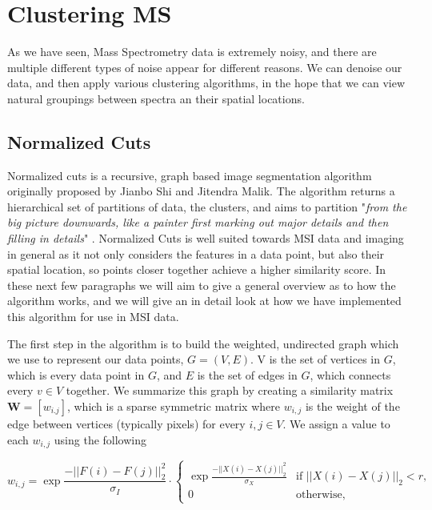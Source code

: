 \documentclass[11pt,openany]{book}
\begin{document}
\chapter{Clustering MS}
As we have seen, Mass Spectrometry data is extremely noisy, and there are multiple different types of noise appear for different reasons. We can denoise our data, and then apply various clustering algorithms, in the hope that we can view natural groupings between spectra an their spatial locations. 

\section{Normalized Cuts}
Normalized cuts is a recursive, graph based image segmentation algorithm originally proposed by Jianbo Shi and Jitendra Malik. The algorithm returns a hierarchical set of partitions of data, the clusters, and aims to partition "\textit{from the big picture downwards, like a painter first marking out major details and then filling in details}" \cite{normalized_cuts_algorithm}. Normalized Cuts is well suited towards MSI data and imaging in general as it not only considers the features in a data point, but also their spatial location, so points closer together achieve a higher similarity score. In these next few paragraphs we will aim to give a general overview as to how the algorithm works, and we will give an in detail look at how we have implemented this algorithm for use in MSI data.

The first step in the algorithm is to build the weighted, undirected graph which we use to represent our data points, $G = (V, E)$. V is the set of vertices in $G$, which is every data point in $G$, and $E$ is the set of edges in $G$, which connects every $v \in V$ together. We summarize this graph by creating a similarity matrix $\mathbf{W} = [w_{i.j}]$, which is a sparse symmetric matrix where $w_{i,j}$ is the weight of the edge between vertices (typically pixels) for every $i,j \in V$. We assign a value to each $w_{i,j}$ using the following 

\begin{equation}
    w_{i,j} = \exp{ \frac{ -{|| F(i) - F(j) ||}_2^2 }{ \sigma_I }   }  \cdot 
        \begin{cases}
        \exp{ \frac{ -{|| X(i) - X(j) ||}_2^2 }{ \sigma_X }   } & \text{if } || X(i) - X(j) ||_2 < r,\\ 
        0 & \text{otherwise},
        \end{cases}
    \label{equation:norm_cuts_assign_weight_w_ij}
\end{equation}
\end{document}
